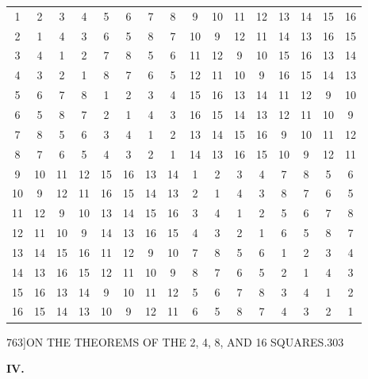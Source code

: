 \documentclass[11pt]{article}
\begin{document}
\begin{center}
\begin{tabular}{cccc|cccc|cccc|cccc}
1 & 2 & 3 & 4 & 5 & 6 & 7 & 8 & 9 & 10 & 11 & 12 & 13 & 14 & 15 & 16 \\
2 & 1 & 4 & 3 & 6 & 5 & 8 & 7 & 10 & 9 & 12 & 11 & 14 & 13 & 16 & 15 \\
3 & 4 & 1 & 2 & 7 & 8 & 5 & 6 & 11 & 12 & 9 & 10 & 15 & 16 & 13 & 14 \\
4 & 3 & 2 & 1 & 8 & 7 & 6 & 5 & 12 & 11 & 10 & 9 & 16 & 15 & 14 & 13 \\
\hline
5 & 6 & 7 & 8 & 1 & 2 & 3 & 4 & 15 & 16 & 13 & 14 & 11 & 12 & 9 & 10 \\
6 & 5 & 8 & 7 & 2 & 1 & 4 & 3 & 16 & 15 & 14 & 13 & 12 & 11 & 10 & 9 \\
7 & 8 & 5 & 6 & 3 & 4 & 1 & 2 & 13 & 14 & 15 & 16 & 9 & 10 & 11 & 12 \\
8 & 7 & 6 & 5 & 4 & 3 & 2 & 1 & 14 & 13 & 16 & 15 & 10 & 9 & 12 & 11 \\
\hline
9 & 10 & 11 & 12 & 15 & 16 & 13 & 14 & 1 & 2 & 3 & 4 & 7 & 8 & 5 & 6 \\
10 & 9 & 12 & 11 & 16 & 15 & 14 & 13 & 2 & 1 & 4 & 3 & 8 & 7 & 6 & 5 \\
11 & 12 & 9 & 10 & 13 & 14 & 15 & 16 & 3 & 4 & 1 & 2 & 5 & 6 & 7 & 8 \\
12 & 11 & 10 & 9 & 14 & 13 & 16 & 15 & 4 & 3 & 2 & 1 & 6 & 5 & 8 & 7 \\
\hline
13 & 14 & 15 & 16 & 11 & 12 & 9 & 10 & 7 & 8 & 5 & 6 & 1 & 2 & 3 & 4 \\
14 & 13 & 16 & 15 & 12 & 11 & 10 & 9 & 8 & 7 & 6 & 5 & 2 & 1 & 4 & 3 \\
15 & 16 & 13 & 14 & 9 & 10 & 11 & 12 & 5 & 6 & 7 & 8 & 3 & 4 & 1 & 2 \\
16 & 15 & 14 & 13 & 10 & 9 & 12 & 11 & 6 & 5 & 8 & 7 & 4 & 3 & 2 & 1 \\
\end{tabular}
\end{center}

\begin{center}
{\small 763]\hfill ON THE THEOREMS OF THE 2, 4, 8, AND 16 SQUARES.\hfill 303}
\end{center}

\begin{center}\textbf{IV.}\end{center}
\end{document}
